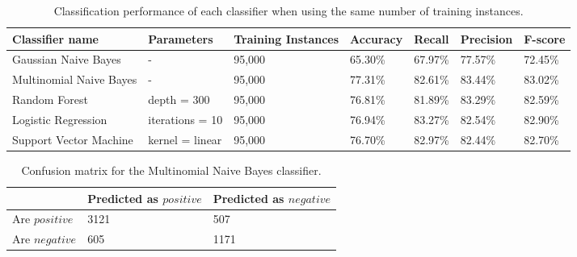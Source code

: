 \begin{table}
\centering
\caption{Classification performance of each classifier when using the same number of training instances.}
\begin{tabular}{ |p{3cm}||p{3cm}|p{2cm}|p{1.5cm}|p{1.5cm}|p{1.5cm}|p{1.5cm}| }
 \hline
 Classifier name &       Parameters &    Training Instances &Accuracy &  Recall &     Precision& F-score \\
 \hline
 Gaussian Naive Bayes &-&     95,000&                 65.30\%& 67.97\%&       77.57\%& 72.45\%\\
  \hline
 Multinomial Naive Bayes  &-&     95,000& 77.31\%&        82.61\%&       83.44\%& 83.02\%\\
  \hline
 Random Forest              &depth = 300&            95,000&76.81\%&  81.89\%&     83.29\%& 82.59\%\\
  \hline
 Logistic Regression        &iterations = 10&   95,000&    76.94\%&        83.27\%&   82.54\%& 82.90\%\\
  \hline
 Support Vector Machine     &kernel = linear&   95,000&     76.70\%& 82.97\%&  82.44\%& 82.70\%\\
 \hline
\end{tabular}
\label{tab:evaluations_euqal}
\end{table}
\begin{table}
\centering
\caption{Confusion matrix for the Multinomial Naive Bayes classifier.}
\begin{tabular}{ |p{3cm}||p{3cm}|p{3cm}| }
 \hline
  &          Predicted as $positive$ &Predicted as $negative$  \\
 \hline
 Are $positive$        & 3121&            507\\
  \hline
 Are $negative$  &605&                     1171\\
 \hline

\end{tabular}
\label{tab:evaluations_conf}
\end{table}
